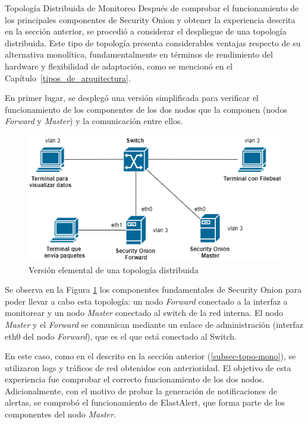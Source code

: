     \begin{subsection}{Topología Distribuida de Monitoreo}
    \label{sec_topo_dist}
    Después de comprobar el funcionamiento de los principales componentes de Security Onion y obtener la experiencia descrita en la sección anterior, se procedió a considerar el despliegue de una topología distribuida. Este tipo de topología presenta considerables ventajas respecto de su alternativa monolítica, fundamentalmente en términos de rendimiento del hardware y flexibilidad de adaptación, como se mencionó en el Capítulo~\ref{tipos_de_arquitectura}.\par
    En primer lugar, se desplegó una versión simplificada para verificar el funcionamiento de los componentes de los dos nodos que la componen (nodos \textit{Forward} y \textit{Master}) y la comunicación entre ellos.
    \begin{figure}[H]
    \centering
    \includegraphics[width=1\textwidth]{./iteracion_1_imagenes/figura_33_b_topologia_de_prueba_2.png}
    \caption{Versión elemental de una topología distribuida}
    \label{fig:topologia_distribuida_1}
    \end{figure}
    Se observa en la Figura \ref{fig:topologia_distribuida_1} los componentes fundamentales de Security Onion para poder llevar a cabo esta topología: un nodo \textit{Forward} conectado a la interfaz a monitorear y un nodo \textit{Master} conectado al switch de la red interna. El nodo \textit{Master} y el \textit{Forward} se comunican mediante un enlace de administración (interfaz eth0 del nodo \textit{Forward}), que es el que está conectado al Switch. \par
    En este caso, como en el descrito en la sección anterior (\ref{subsec-topo-mono}), se utilizaron logs y tráficos de red obtenidos con anterioridad. El objetivo de esta experiencia fue comprobar el correcto funcionamiento de los dos nodos. Adicionalmente, con el motivo de probar la generación de notificaciones de alertas, se comprobó el funcionamiento de ElastAlert, que forma parte de los componentes del nodo \textit{Master}. \par

\end{subsection}
